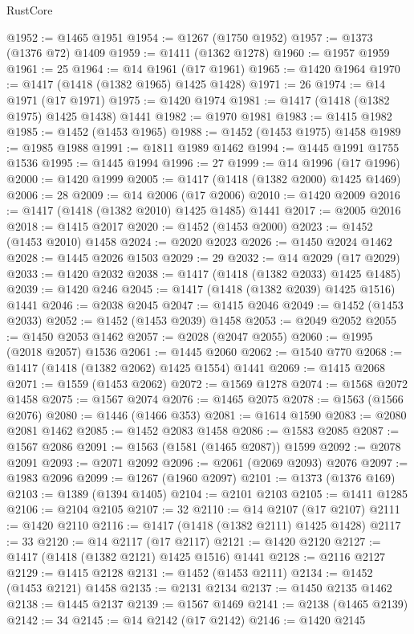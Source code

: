 \begin{lexlean}{RustCore}
\begin{coremodule}
@1952 := @1465 @1951
@1954 := @1267 (@1750 @1952)
@1957 := @1373 (@1376 @72) @1409
@1959 := @1411 (@1362 @1278)
@1960 := @1957 @1959
@1961 := 25
@1964 := @14 @1961 (@17 @1961)
@1965 := @1420 @1964
@1970 := @1417 (@1418 (@1382 @1965) @1425 @1428)
@1971 := 26
@1974 := @14 @1971 (@17 @1971)
@1975 := @1420 @1974
@1981 := @1417 (@1418 (@1382 @1975) @1425 @1438) @1441
@1982 := @1970 @1981
@1983 := @1415 @1982
@1985 := @1452 (@1453 @1965)
@1988 := @1452 (@1453 @1975) @1458
@1989 := @1985 @1988
@1991 := @1811 @1989 @1462
@1994 := @1445 @1991 @1755 @1536
@1995 := @1445 @1994
@1996 := 27
@1999 := @14 @1996 (@17 @1996)
@2000 := @1420 @1999
@2005 := @1417 (@1418 (@1382 @2000) @1425 @1469)
@2006 := 28
@2009 := @14 @2006 (@17 @2006)
@2010 := @1420 @2009
@2016 := @1417 (@1418 (@1382 @2010) @1425 @1485) @1441
@2017 := @2005 @2016
@2018 := @1415 @2017
@2020 := @1452 (@1453 @2000)
@2023 := @1452 (@1453 @2010) @1458
@2024 := @2020 @2023
@2026 := @1450 @2024 @1462
@2028 := @1445 @2026 @1503
@2029 := 29
@2032 := @14 @2029 (@17 @2029)
@2033 := @1420 @2032
@2038 := @1417 (@1418 (@1382 @2033) @1425 @1485)
@2039 := @1420 @246
@2045 := @1417 (@1418 (@1382 @2039) @1425 @1516) @1441
@2046 := @2038 @2045
@2047 := @1415 @2046
@2049 := @1452 (@1453 @2033)
@2052 := @1452 (@1453 @2039) @1458
@2053 := @2049 @2052
@2055 := @1450 @2053 @1462
@2057 := @2028 (@2047 @2055)
@2060 := @1995 (@2018 @2057) @1536
@2061 := @1445 @2060
@2062 := @1540 @770
@2068 := @1417 (@1418 (@1382 @2062) @1425 @1554) @1441
@2069 := @1415 @2068
@2071 := @1559 (@1453 @2062)
@2072 := @1569 @1278
@2074 := @1568 @2072 @1458
@2075 := @1567 @2074
@2076 := @1465 @2075
@2078 := @1563 (@1566 @2076)
@2080 := @1446 (@1466 @353)
@2081 := @1614 @1590
@2083 := @2080 @2081 @1462
@2085 := @1452 @2083 @1458
@2086 := @1583 @2085
@2087 := @1567 @2086
@2091 := @1563 (@1581 (@1465 @2087)) @1599
@2092 := @2078 @2091
@2093 := @2071 @2092
@2096 := @2061 (@2069 @2093) @2076
@2097 := @1983 @2096
@2099 := @1267 (@1960 @2097)
@2101 := @1373 (@1376 @169)
@2103 := @1389 (@1394 @1405)
@2104 := @2101 @2103
@2105 := @1411 @1285
@2106 := @2104 @2105
@2107 := 32
@2110 := @14 @2107 (@17 @2107)
@2111 := @1420 @2110
@2116 := @1417 (@1418 (@1382 @2111) @1425 @1428)
@2117 := 33
@2120 := @14 @2117 (@17 @2117)
@2121 := @1420 @2120
@2127 := @1417 (@1418 (@1382 @2121) @1425 @1516) @1441
@2128 := @2116 @2127
@2129 := @1415 @2128
@2131 := @1452 (@1453 @2111)
@2134 := @1452 (@1453 @2121) @1458
@2135 := @2131 @2134
@2137 := @1450 @2135 @1462
@2138 := @1445 @2137
@2139 := @1567 @1469
@2141 := @2138 (@1465 @2139)
@2142 := 34
@2145 := @14 @2142 (@17 @2142)
@2146 := @1420 @2145

\end{coremodule}
\end{lexlean}
